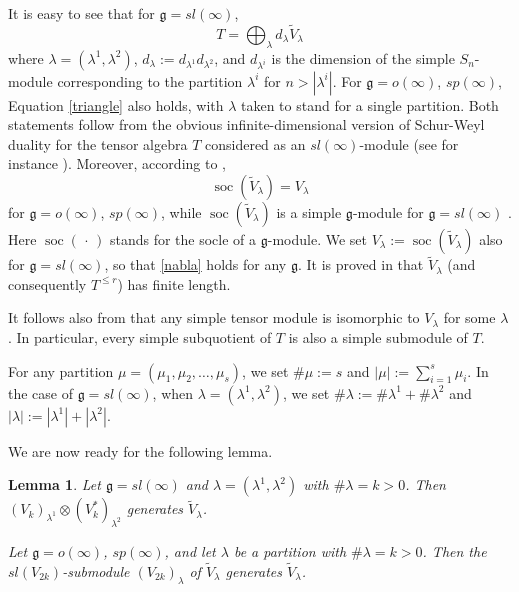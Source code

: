 \documentclass{amsart}
\renewcommand{\sl}{sl}
\newcommand{\so}{o}
\renewcommand{\sp}{sp}
\renewcommand{\gg}{\mathfrak{g}}
\newcommand{\soc}{\operatorname{soc}}
\newtheorem{lemma}[thm]{Lemma}
\theoremstyle{definition}
\numberwithin{equation}{section}
\begin{document}
It is easy to see that for $\gg = \sl(\infty)$,
\begin{equation}\label{triangle}
T = \bigoplus_\lambda d_\lambda \tilde V_\lambda
\end{equation}
where $\lambda = (\lambda^1, \lambda^2)$, $d_\lambda := d_{\lambda^1} d_{\lambda^2}$, and $d_{\lambda^i}$ is the dimension of the simple $S_n$-module corresponding to the partition $\lambda^i$ for $n > | \lambda^i |$.  For $\gg = \so(\infty)$, $\sp(\infty)$, Equation \eqref{triangle} also holds, with $\lambda$ taken to stand for a single partition.  Both statements follow from the obvious infinite-dimensional version of Schur-Weyl duality for the tensor algebra $T$ considered as an $\sl(\infty)$-module (see for instance \cite{PStyr}).  Moreover, according to \cite[Theorems 3.2, 4.2]{PStyr}, 
\begin{equation} \label{nabla}
\soc (\tilde V_\lambda) = V_\lambda
\end{equation}
for $\gg = \so(\infty)$, $\sp(\infty)$, while $\soc (\tilde{V}_\lambda)$ is a simple $\gg$-module for $\gg = \sl(\infty)$ \cite[Theorem 2.3]{PStyr}.  Here $\soc(\, \cdot \,)$ stands for the socle of a $\gg$-module.  We set $V_\lambda := \soc (\tilde V_\lambda)$ also for $\gg = \sl(\infty)$, so that \eqref{nabla} holds for any $\gg$.  It is proved in \cite{PStyr} that $\tilde{V}_\lambda$ (and consequently $T^{\leq r}$) has finite length.

It follows also from \cite{PStyr} that any simple tensor module is isomorphic to $V_\lambda$ for some $\lambda$.  In particular, every simple subquotient of $T$ is also a simple submodule of $T$.

For any partition $\mu = ( \mu_1, \mu_2, \ldots , \mu_s )$, we set $\# \mu := s$ and $| \mu | := \sum_{i=1}^s \mu_i$.  In the case of $\gg = \sl(\infty)$, when $\lambda = (\lambda^1, \lambda^2)$, we set $\# \lambda := \# \lambda^1 + \# \lambda^2$ and $| \lambda | := | \lambda^1 | + | \lambda^2 |$.  

We are now ready for the following lemma.

\begin{lemma} \label{nonzeromarks}
Let $\gg=\sl(\infty)$ and $\lambda=(\lambda^1,\lambda^2)$ with $\# \lambda = k > 0$. 
Then $(V_k)_{\lambda^1} \otimes (V_k^*)_{\lambda^2}$ generates
$\tilde{V}_\lambda$. 

Let $\gg = \so(\infty)$, $\sp(\infty)$, and let $\lambda$ be a partition with $\# \lambda = k > 0$. Then
the $\sl(V_{2k})$-submodule $(V_{2k})_\lambda$ of $\tilde{V}_\lambda$ generates $\tilde{V}_\lambda$. 
\end{lemma}
\end{document}
